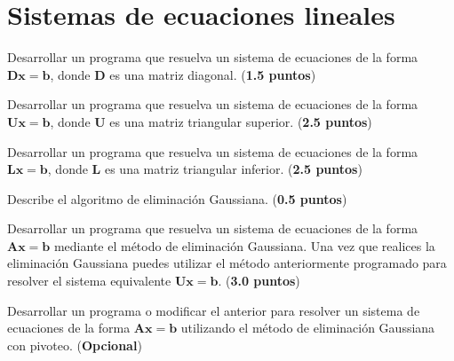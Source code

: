 \documentclass{article}
\theoremstyle{problemstyle}
\begin{document}
\section{Sistemas de ecuaciones lineales}\label{sec:sistemas_de_ecuaciones_lineales} %


\begin{problem}
  Desarrollar un programa que resuelva un sistema de ecuaciones de la forma $\mathbf{Dx} = \mathbf{b}$, donde $ \mathbf{D} $ es una matriz diagonal. (\textbf{1.5 puntos})
\end{problem}

\begin{problem}
  Desarrollar un programa que resuelva un sistema de ecuaciones de la forma $\mathbf{Ux} = \mathbf{b}$, donde $ \mathbf{U} $ es una matriz triangular superior. (\textbf{2.5 puntos})
\end{problem}

\begin{problem}
  Desarrollar un programa que resuelva un sistema de ecuaciones de la forma $\mathbf{Lx} = \mathbf{b}$, donde $ \mathbf{L} $ es una matriz triangular inferior. (\textbf{2.5 puntos})
\end{problem}

\begin{problem}
  Describe el algoritmo de eliminaci\'on Gaussiana. (\textbf{0.5 puntos})
\end{problem}

\begin{problem}
  Desarrollar un programa que resuelva un sistema de ecuaciones de la forma $ \mathbf{Ax} = \mathbf{b} $ mediante el m\'etodo de eliminaci\'on Gaussiana. Una vez que realices la eliminaci\'on Gaussiana puedes utilizar el m\'etodo anteriormente programado para resolver el sistema equivalente $ \mathbf{Ux} = \mathbf{b} $. (\textbf{3.0 puntos})
\end{problem}

\begin{problem}
  Desarrollar un programa o modificar el anterior para resolver un sistema de ecuaciones de la forma $ \mathbf{Ax} = \mathbf{b} $ utilizando el m\'etodo de eliminaci\'on Gaussiana con pivoteo. (\textbf{Opcional})
\end{problem}

\end{document}
